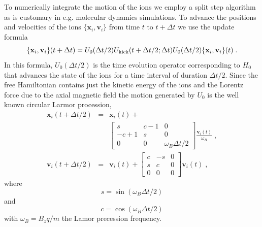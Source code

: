 \documentclass[aps, pra, twocolumn]{revtex4-1}
\newcommand{\hzero}{H_0}
\begin{document}
To numerically integrate the motion of the ions we employ a split
step algorithm as is customary in e.g. molecular dynamics
simulations. To advance the positions and velocities of the ions
$\{\mathbf{x}_i, \mathbf{v}_i\}$
from time $t$ to $t + \Delta t$ we use the update formula
\begin{equation}
  \{\mathbf{x}_i, \mathbf{v}_i\}(t+\Delta t) =
  U_{0}(\Delta t /2)
  U_{\rm kick}(t + \Delta t / 2; \Delta t)
  U_{0}(\Delta t /2)
  \{\mathbf{x}_i, \mathbf{v}_i\}(t)\;.
\end{equation}
In this formula, $U_{0}(\Delta t/2)$ is the time evolution
operator corresponding to $\hzero$ that advances the state of
the ions for a time interval of duration $\Delta t / 2$. Since
the free Hamiltonian contains just the kinetic energy of the ions
and the Lorentz force due to the axial magnetic field the motion
generated by $U_{0}$ is the well known circular Larmor
procession,
\begin{eqnarray}
  \mathbf{x}_i(t + \Delta t / 2) &=&
                                   \mathbf{x}_i(t)+\\
  &&
      \left[\begin{array}{ccc}
        s & c - 1 & 0\\
        -c + 1 & s & 0\\
        0 & 0 & \omega_B\Delta t / 2
      \end{array}\right]\frac{\mathbf{v}_i(t)}{\omega_B}\;,\nonumber\\
  \mathbf{v}_i(t+\Delta t/2) &=&\mathbf{v}_i(t) + \left[\begin{array}{ccc}
        c & -s & 0\\
        s & c & 0\\
        0 & 0 & 0
      \end{array}\right]\mathbf{v}_i(t)\;,
\end{eqnarray}
where
\begin{equation}
  s = \sin(\omega_B \Delta t / 2)
\end{equation}
and
\begin{equation}
  c = \cos(\omega_B \Delta t / 2)
\end{equation}
with $\omega_B=B_zq/m$ the Lamor precession frequency.
\end{document}
